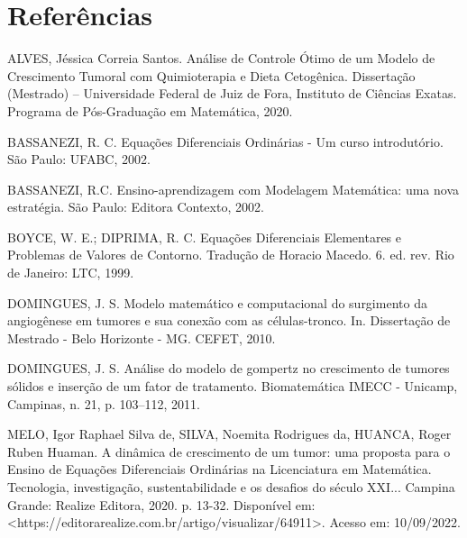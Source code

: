 \section*{Referências}

\noindent ALVES, Jéssica Correia Santos. Análise de Controle Ótimo de um Modelo de Crescimento Tumoral com Quimioterapia e Dieta Cetogênica. Dissertação (Mestrado) – Universidade Federal de Juiz de Fora, Instituto de Ciências Exatas. Programa de Pós-Graduação em Matemática, 2020.
\vspace{8pt}

\noindent BASSANEZI, R. C. Equações Diferenciais Ordinárias - Um curso introdutório. São Paulo: UFABC, 2002.
\vspace{8pt}

\noindent BASSANEZI, R.C. Ensino-aprendizagem com Modelagem Matemática: uma nova estratégia. São Paulo: Editora Contexto, 2002.
\vspace{8pt}

\noindent BOYCE, W. E.; DIPRIMA, R. C. Equações Diferenciais Elementares e Problemas de Valores de Contorno. Tradução de Horacio Macedo. 6. ed. rev. Rio de Janeiro: LTC, 1999.
\vspace{8pt}

\noindent DOMINGUES, J. S. Modelo matemático e computacional do surgimento da angiogênese em tumores e sua conexão com as células-tronco. In. Dissertação de Mestrado - Belo Horizonte - MG. CEFET, 2010.
\vspace{8pt}

\noindent DOMINGUES, J. S. Análise do modelo de gompertz no crescimento de tumores sólidos e inserção de um fator de tratamento. Biomatemática IMECC - Unicamp, Campinas, n. 21, p. 103–112, 2011.
\vspace{8pt}

\noindent MELO, Igor Raphael Silva de, SILVA, Noemita Rodrigues da, HUANCA, Roger Ruben Huaman. A dinâmica de crescimento de um tumor: uma proposta para o Ensino de Equações Diferenciais Ordinárias na Licenciatura em Matemática. Tecnologia, investigação, sustentabilidade e os desafios do século XXI... Campina Grande: Realize Editora, 2020. p. 13-32. Disponível em: <https://editorarealize.com.br/artigo/visualizar/64911>. Acesso em: 10/09/2022.
\vspace{8pt}
